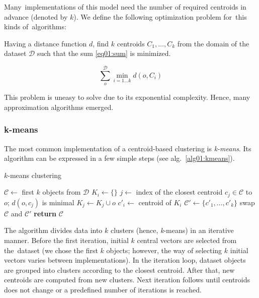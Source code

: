 Many~implementations of this model need the number of required centroids in advance (denoted by $k$). We define the following optimization problem for~this kinds of~algorithms: 

\begin{problem}
	Having a distance function $d$, find $k$ centroids $C_1,\dots,C_k$ from the domain of the dataset $\mathcal{D}$ such that the sum \ref{eq01:sum}
	is minimized.
\end{problem}

\begin{equation}\label{eq01:sum}
	\sum_o^{\mathcal{D}} \min_{i=1\dots k}d(o,C_i)
\end{equation}

This problem is uneasy to solve due to its exponential complexity. Hence, many approximation algorithms emerged. 

\subsubsection{k-means}

The most common implementation of a centroid-based clustering is \emph{k-means}. Its algorithm can be expressed in a few simple steps (see alg.~\ref{alg01:kmeans}).

\begin{algorithm}
	\caption{$k$-means clustering}
	\label{alg01:kmeans}
	\begin{algorithmic}[1]
		\State $\mathcal{C} \gets$ first $k$ objects from  $\mathcal{D}$ 
		\Repeat
				\State $K_i \gets \{\}$
			\EndFor
				\State $j \gets$ index of the closest centroid $c_j \in \mathcal{C}$ to $o$; $d(o,c_j)$ is minimal
				\State $K_{j} \gets K_{j} \cup o$ 
			\EndFor
				\State $c'_i \gets$ centroid of $K_i$ 
			\EndFor
			\State $\mathcal{C}' \gets \{c'_1,\dots,c'_k\}$
			\State swap $\mathcal{C}$ and $\mathcal{C}'$
		\State \textbf{return} $\mathcal{C}$
		\EndProcedure
	\end{algorithmic}
\end{algorithm}


The algorithm divides data into $k$ clusters (hence, \emph{k}-means) in an iterative manner. Before the first iteration, initial $k$ central vectors are selected from the~dataset (we chose the first $k$ objects; however, the way of selecting $k$ initial vectors varies between 
implementations). In the iteration loop, dataset objects are grouped into clusters according to the closest centroid. After that, new centroids are computed from new clusters. Next iteration follows until centroids does not change or a predefined number of iterations is reached. 

